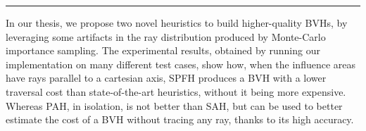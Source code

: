 \documentclass[11pt,a4paper,twocolumn]{article}
\begin{document}
\rule{0.471\textwidth}{0.5pt}

In our thesis, we propose two novel heuristics to build higher-quality BVHs, by leveraging some artifacts in the ray distribution produced by Monte-Carlo importance sampling. The experimental results, obtained by running our implementation on many different test cases, show how, when the influence areas have rays parallel to a cartesian axis, SPFH produces a BVH with a lower traversal cost than state-of-the-art heuristics, without it being more expensive. Whereas PAH, in isolation, is not better than SAH, but can be used to better estimate the cost of a BVH without tracing any ray, thanks to its high accuracy.
\end{document}
